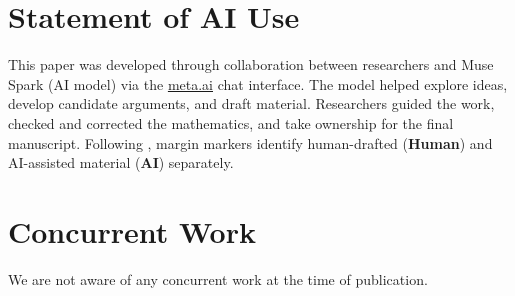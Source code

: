 \documentclass[11pt]{article}
\newcommand{\HumanLabel}{
({\bfseries\sffamily\color{humancolor!70}Human})
}
\newcommand{\AILabel}{
({\bfseries\sffamily\color{aicolor!70}AI})
}
\theoremstyle{plain}
\theoremstyle{definition}
\begin{document}
\section*{Statement of AI Use}

\begin{humanblock}
This paper was developed through collaboration between researchers and Muse Spark (AI model) via the \href{http://meta.ai}{meta.ai} chat interface. The model helped explore ideas, develop candidate arguments, and draft material. Researchers guided the work, checked and corrected the mathematics, and take ownership for the final manuscript. Following \cite{schmitt2025extremal}, margin markers identify human-drafted \!\!\HumanLabel and AI-assisted material \!\!\AILabel separately.
\end{humanblock}

\section*{Concurrent Work}
\begin{humanblock}
We are not aware of any concurrent work at the time of publication.
\end{humanblock}
\end{document}
